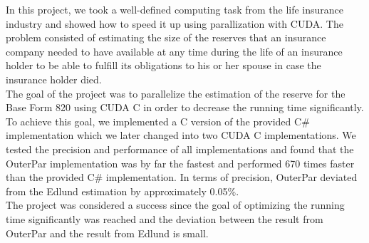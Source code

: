 In this project, we took a well-defined computing task from the life insurance industry and showed how to speed it up using parallization with CUDA. The problem consisted of estimating the size of the reserves that an insurance company needed to have available at any time during the life of an insurance holder to be able to fulfill its obligations to his or her spouse in case the insurance holder died.\\

The goal of the project was to parallelize the estimation of the reserve for the Base Form 820 using CUDA C in order to decrease the running time significantly. To achieve this goal, we implemented a C version of the provided C\# implementation which we later changed into two CUDA C implementations. We tested the precision and performance of all implementations and found that the OuterPar implementation was by far the fastest and performed 670 times faster than the provided C\# implementation. In terms of precision, OuterPar deviated from the Edlund estimation by approximately 0.05\%.\\

The project was considered a success since the goal of optimizing the running time significantly was reached and the deviation between the result from OuterPar and the result from Edlund is small.
